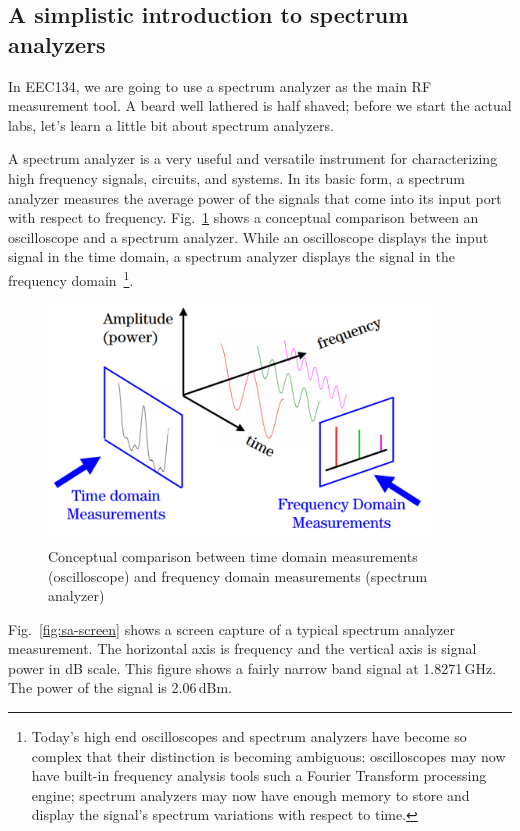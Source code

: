 \documentclass[letterpaper, 11pt]{article}
\begin{document}
\subsection{A simplistic introduction to spectrum analyzers}
In EEC134, we are going to use a spectrum analyzer as the main RF measurement tool. A beard well lathered is half shaved; before we start the actual labs, let's learn a little bit about spectrum analyzers.

A spectrum analyzer is a very useful and versatile instrument for characterizing high frequency signals, circuits, and systems. In its basic form, a spectrum analyzer measures the average power of the signals that come into its input port with respect to frequency. Fig.~\ref{fig:amp-time-frequency} shows a conceptual comparison between an oscilloscope and a spectrum analyzer. While an oscilloscope displays the input signal in the time domain, a spectrum analyzer displays the signal in the frequency domain~\footnote{Today’s high end oscilloscopes and spectrum analyzers have become so complex that their distinction is becoming ambiguous: oscilloscopes may now have built-in frequency analysis tools such a Fourier Transform processing engine; spectrum analyzers may now have enough memory to store and display the signal’s spectrum variations with respect to time.}. 

\begin{figure}[h]
	\centering
	\includegraphics[width=4in]{amp-time-frequency}
	\caption{Conceptual comparison between time domain measurements (oscilloscope) and frequency domain measurements (spectrum analyzer)~\cite{thomas-sa}}
	\label{fig:amp-time-frequency}
\end{figure}

Fig.~\ref{fig:sa-screen} shows a screen capture of a typical spectrum analyzer measurement. The horizontal axis is frequency and the vertical axis is signal power in dB scale. This figure shows a fairly narrow band signal at 1.8271\,GHz. The power of the signal is 2.06\,dBm.
\end{document}
